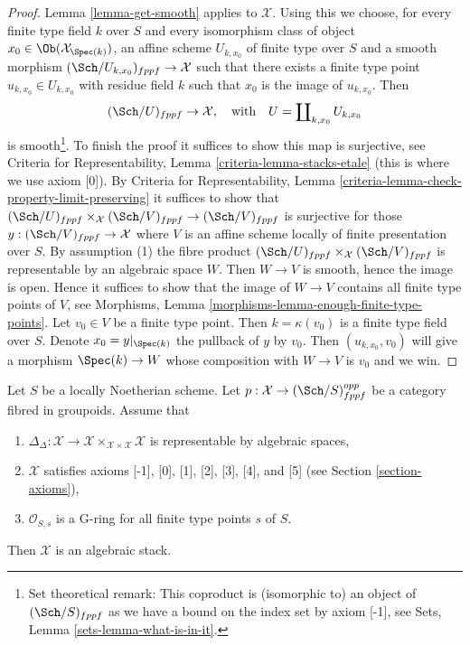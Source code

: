 \begin{proof}
Lemma \ref{lemma-get-smooth} applies to $\mathcal{X}$. Using this we
choose, for every finite type field $k$ over $S$ and every
isomorphism class of object $x_0 \in \Ob(\mathcal{X}_{\Spec(k)})$,
an affine scheme $U_{k, x_0}$ of finite type over $S$ and a smooth morphism
$(\Sch/U_{k, x_0})_{fppf} \to \mathcal{X}$ such that there exists a finite
type point $u_{k, x_0} \in U_{k, x_0}$ with residue field $k$ such that $x_0$
is the image of $u_{k, x_0}$. Then
$$
(\Sch/U)_{fppf} \to \mathcal{X},
\quad\text{with}\quad
U = \coprod\nolimits_{k, x_0} U_{k, x_0}
$$
is smooth\footnote{Set theoretical remark: This coproduct is (isomorphic to)
an object of $(\Sch/S)_{fppf}$ as we have a bound on the index set
by axiom [-1], see Sets, Lemma \ref{sets-lemma-what-is-in-it}.}.
To finish the proof it suffices to show this map is surjective,
see Criteria for Representability, Lemma \ref{criteria-lemma-stacks-etale}
(this is where we use axiom [0]). By Criteria for Representability, Lemma
\ref{criteria-lemma-check-property-limit-preserving}
it suffices to show that
$(\Sch/U)_{fppf} \times_\mathcal{X} (\Sch/V)_{fppf} \to (\Sch/V)_{fppf}$
is surjective for those $y : (\Sch/V)_{fppf} \to \mathcal{X}$ where
$V$ is an affine scheme locally of finite presentation
over $S$. By assumption (1) the fibre product
$(\Sch/U)_{fppf} \times_\mathcal{X} (\Sch/V)_{fppf}$ is representable
by an algebraic space $W$. Then $W \to V$ is smooth, hence the image is
open. Hence it suffices to show that the image of $W \to V$ contains all
finite type points of $V$, see
Morphisms, Lemma \ref{morphisms-lemma-enough-finite-type-points}.
Let $v_0 \in V$ be a finite type point. Then $k = \kappa(v_0)$ is
a finite type field over $S$. Denote $x_0 = y|_{\Spec(k)}$
the pullback of $y$ by $v_0$. Then $(u_{k, x_0}, v_0)$ will give
a morphism $\Spec(k) \to W$ whose composition with $W \to V$
is $v_0$ and we win.
\end{proof}

\begin{proposition}
\label{proposition-second-diagonal-representable}
Let $S$ be a locally Noetherian scheme. Let
$p : \mathcal{X} \to (\Sch/S)_{fppf}^{opp}$ be a category fibred in groupoids.
Assume that
\begin{enumerate}
\item $\Delta_\Delta : \mathcal{X} \to
\mathcal{X} \times_{\mathcal{X} \times \mathcal{X}} \mathcal{X}$
is representable by algebraic spaces,
\item $\mathcal{X}$ satisfies axioms [-1], [0], [1], [2], [3], [4], and [5]
(see Section \ref{section-axioms}),
\item $\mathcal{O}_{S, s}$ is a G-ring for all finite type points $s$ of $S$.
\end{enumerate}
Then $\mathcal{X}$ is an algebraic stack.
\end{proposition}

